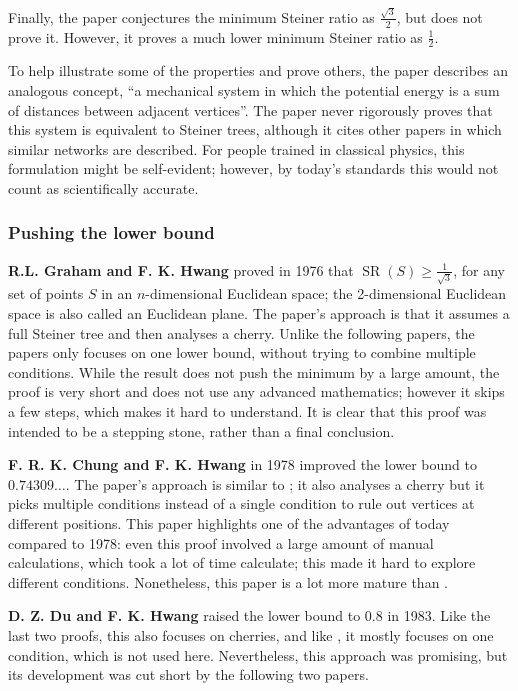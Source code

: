 \documentclass{mpaper}
\begin{document}
Finally, the paper conjectures the minimum Steiner ratio as $\frac{\sqrt{3}}{2}$, but does not prove it. However, it proves a much lower minimum Steiner ratio as $\frac{1}{2}$. %

To help illustrate some of the properties and prove others, the paper describes an analogous concept, ``a mechanical system in which the potential energy is a sum of distances between adjacent vertices''. The paper never rigorously proves that this system is equivalent to Steiner trees, although it cites other papers in which similar networks are described. For people trained in classical physics, this formulation might be self-evident; however, by today's standards this would not count as scientifically accurate.


\subsubsection{Pushing the lower bound}
\textbf {R.L. Graham and F. K. Hwang} \cite{1/sqrt3} proved in 1976 that $\operatorname{SR}(S)\geq\frac{1}{\sqrt{3}}$, for any set of points $S$ in an $n$-dimensional Euclidean space; the 2-dimensional Euclidean space is also called an Euclidean plane.  The paper's approach is that it assumes a full Steiner tree and then analyses a cherry. Unlike the following papers, the papers only focuses on one lower bound, without trying to combine multiple conditions. While the result does not push the minimum by a large amount, the proof is very short and does not use any advanced mathematics; however it skips a few steps, which makes it hard to understand. It is clear that this proof was intended to be a stepping stone, rather than a final conclusion. 

\textbf{F. R. K. Chung and F. K. Hwang} \cite{3a161666-bf4c-3db7-b5bc-795aa21aed1b}  in 1978 improved the lower bound to $0.74309\dots$. The paper's approach is similar to \cite{1/sqrt3}; it also analyses a cherry but it picks multiple conditions instead of a single condition to rule out vertices at different positions. This paper highlights one of the advantages of today compared to 1978: even this proof involved a large amount of manual calculations, which took a lot of time calculate; this made it hard to explore different conditions. Nonetheless, this paper is a lot more mature than \cite{1/sqrt3}.

\textbf{D. Z. Du and F. K. Hwang} \cite{d6ebcb0d-eded-3f80-b57b-cda0b84fa6c0} raised the lower bound to 0.8 in 1983. Like the last two proofs, this also focuses on cherries, and like \cite{1/sqrt3}, it mostly focuses on one condition, which is not used here. Nevertheless, this approach was promising, but its development was cut short by the following two papers.
\end{document}

